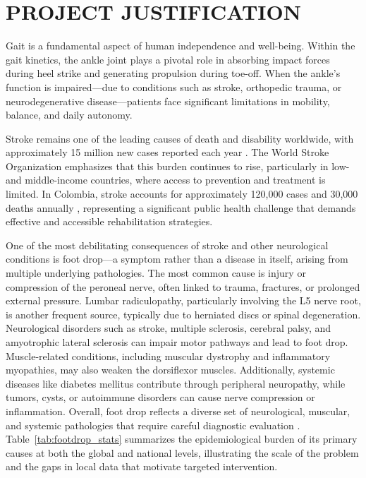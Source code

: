 \chapter{PROJECT JUSTIFICATION}\label{project_justification}
\graphicspath{{images/}}

Gait is a fundamental aspect of human independence and well-being. Within the gait kinetics, the ankle joint plays a pivotal role in absorbing impact 
forces during heel strike and generating propulsion during toe-off. When the ankle's function is impaired—due to conditions such as stroke, orthopedic 
trauma, or neurodegenerative disease—patients face significant limitations in mobility, balance, and daily autonomy.

Stroke remains one of the leading causes of death and disability worldwide, with approximately 15 million new cases reported each year \cite{WSO2025}. 
The World Stroke Organization emphasizes that this burden continues to rise, particularly in low- and middle-income countries, where access to prevention 
and treatment is limited. In Colombia, stroke accounts for approximately 120,000 cases and 30,000 deaths annually \cite{Recavar2026}, representing a 
significant public health challenge that demands effective and accessible rehabilitation strategies.

One of the most debilitating consequences of stroke and other neurological conditions is foot drop—a symptom rather than a disease in itself, arising 
from multiple underlying pathologies. The most common cause is injury or compression of the peroneal nerve, often linked to trauma, fractures, or prolonged 
external pressure. Lumbar radiculopathy, particularly involving the L5 nerve root, is another frequent source, typically due to herniated discs or spinal 
degeneration. Neurological disorders such as stroke, multiple sclerosis, cerebral palsy, and amyotrophic lateral sclerosis can impair motor pathways and 
lead to foot drop. Muscle-related conditions, including muscular dystrophy and inflammatory myopathies, may also weaken the dorsiflexor muscles. Additionally,
 systemic diseases like diabetes mellitus contribute through peripheral neuropathy, while tumors, cysts, or autoimmune disorders can cause nerve compression or 
 inflammation. Overall, foot drop reflects a diverse set of neurological, muscular, and systemic pathologies that require careful diagnostic evaluation 
 \cite{PeronealNerveInjury, LumbarRadiculopathy, NeurologicalCauses, MuscleDisorders, SystemicCauses}. Table~\ref{tab:footdrop_stats} summarizes the epidemiological 
 burden of its primary causes at both the global and national levels, illustrating the scale of the problem and the gaps in local data that motivate targeted intervention.

